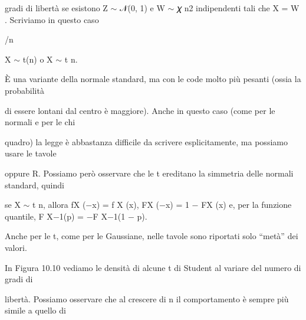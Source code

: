 \documentclass[a4paper,portrait,12pt]{article}
\begin{document}
\begin{flushleft}
gradi di libert\`{a} se esistono Z $\sim$ 𝒩(0, 1) e W $\sim$ 𝜒 n2 indipendenti tali che X = W . Scriviamo in questo caso
\end{flushleft}


\begin{flushleft}
/n
\end{flushleft}


\begin{flushleft}
X $\sim$ t(n) o X $\sim$ t n.
\end{flushleft}


\begin{flushleft}
\`{E} una variante della normale standard, ma con le code molto più pesanti (ossia la probabilit\`{a}
\end{flushleft}


\begin{flushleft}
di essere lontani dal centro \`{e} maggiore). Anche in questo caso (come per le normali e per le chi
\end{flushleft}


\begin{flushleft}
quadro) la legge \`{e} abbastanza difficile da scrivere esplicitamente, ma possiamo usare le tavole
\end{flushleft}


\begin{flushleft}
oppure R. Possiamo per\`{o} osservare che le t ereditano la simmetria delle normali standard, quindi
\end{flushleft}


\begin{flushleft}
se X $\sim$ t n, allora fX ($-$x) = f X (x), FX ($-$x) = 1 $-$ FX (x) e, per la funzione quantile, F X$-$1(p) = $-$F X$-$1(1 $-$ p).
\end{flushleft}


\begin{flushleft}
Anche per le t, come per le Gaussiane, nelle tavole sono riportati solo {``}met\`{a}'' dei valori.
\end{flushleft}


\begin{flushleft}
In Figura 10.10 vediamo le densit\`{a} di alcune t di Student al variare del numero di gradi di
\end{flushleft}


\begin{flushleft}
libert\`{a}. Possiamo osservare che al crescere di n il comportamento \`{e} sempre più simile a quello di
\end{flushleft}
\end{document}
